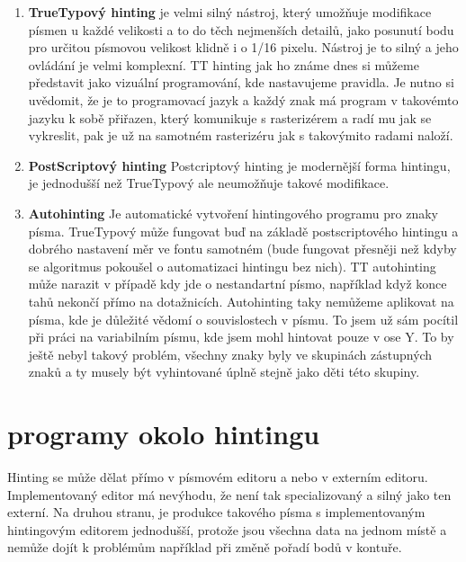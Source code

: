 \documentclass[a4paper]{article}
\begin{document}
\begin{enumerate}
\item \textbf{TrueTypový hinting}
je velmi silný nástroj, který umožňuje modifikace písmen u každé velikosti a to do těch nejmenších detailů, jako posunutí bodu pro určitou písmovou velikost klidně i o 1/16 pixelu. Nástroj je to silný a jeho ovládání je velmi komplexní. TT hinting jak ho známe dnes si můžeme představit jako vizuální programování, kde nastavujeme pravidla. Je nutno si uvědomit, že je to programovací jazyk a každý znak má program v takovémto jazyku k sobě přiřazen, který komunikuje s rasterizérem a radí mu jak se vykreslit, pak je už na samotném rasterizéru jak s takovýmito radami naloží.

\item \textbf{PostScriptový hinting}
Postcriptový hinting je modernější forma hintingu, je jednodušší než TrueTypový ale neumožňuje takové modifikace.

\item \textbf{Autohinting}
Je automatické vytvoření hintingového programu pro znaky písma. TrueTypový může fungovat buď na základě postscriptového hintingu a dobrého nastavení měr ve fontu samotném (bude fungovat přesněji než kdyby se algoritmus pokoušel o automatizaci hintingu bez nich). TT autohinting může narazit v případě kdy jde o nestandartní písmo, například když konce tahů nekončí přímo na dotažnicích. Autohinting taky nemůžeme aplikovat na písma, kde je důležité vědomí o souvislostech v písmu. To jsem už sám pocítil při práci na variabilním písmu, kde jsem mohl hintovat pouze v ose Y. To by ještě nebyl takový problém, všechny znaky byly ve skupinách zástupných znaků a ty musely být vyhintované úplně stejně jako děti této skupiny.
\end{enumerate}

\section{programy okolo hintingu}
Hinting se může dělat přímo v písmovém editoru a nebo v externím editoru. Implementovaný editor má nevýhodu, že není tak specializovaný a silný jako ten externí. Na druhou stranu, je produkce takového písma s implementovaným hintingovým editorem jednodušší, protože jsou všechna data na jednom místě a nemůže dojít k problémům například při změně pořadí bodů v kontuře.
\end{document}
